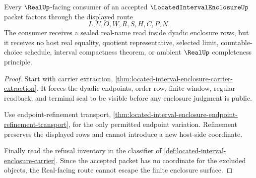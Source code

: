 \begin{theorem}
\label{thm:located-interval-enclosure-real-seal-nonescape}
Every $\RealUp$-facing consumer of an accepted $\LocatedIntervalEnclosureUp$ packet factors through the displayed route
$$
L,U,O,W,R,S,H,C,P,N .
$$
The consumer receives a sealed real-name read inside dyadic enclosure rows, but it receives no host real equality, quotient representative, selected limit, countable-choice schedule, interval compactness theorem, or ambient $\RealUp$ completeness principle.
\end{theorem}
\begin{proof}
Start with carrier extraction, \autoref{thm:located-interval-enclosure-carrier-extraction}. It forces the dyadic endpoints, order row, finite window, regular readback, and terminal seal to be visible before any enclosure judgment is public.

Use endpoint-refinement transport, \autoref{thm:located-interval-enclosure-endpoint-refinement-transport}, for the only permitted endpoint variation. Refinement preserves the displayed rows and cannot introduce a new host-side coordinate.

Finally read the refusal inventory in the classifier of \autoref{def:located-interval-enclosure-carrier}. Since the accepted packet has no coordinate for the excluded objects, the Real-facing route cannot escape the finite enclosure surface.
\end{proof}




